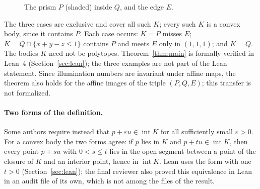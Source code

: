 \documentclass[11pt]{article}
\theoremstyle{definition}
\theoremstyle{remark}
\newcommand{\inter}{\operatorname{int}}
\begin{document}
\begin{figure}
\vspace{-3ex}\centering
{}
\caption{The prism $P$ (shaded) inside $Q$, and the edge $E$.}
\label{fig:prism}
\vspace{-2ex}
\end{figure}

\noindent The three cases are exclusive and cover all such $K$; every such
$K$ is a convex body, since it contains $P$. Each case occurs: $K=P$ misses
$E$; $K=Q\cap\{x+y-z\le1\}$ contains $P$ and meets $E$ only in $(1,1,1)$; and
$K=Q$. The bodies $K$ need not be polytopes. Theorem~\ref{thm:main} is formally
verified in Lean~4 (Section~\ref{sec:lean}); the three examples are not part of
the Lean statement. Since illumination numbers are invariant under affine
maps, the theorem also holds for the affine images of the triple $(P,Q,E)$;
this transfer is not formalized.

\paragraph{Two forms of the definition.} Some authors require instead that
$p+\varepsilon u\in\inter K$ for all sufficiently small $\varepsilon>0$. For a
convex body the two forms agree: if $p$ lies in $K$ and $p+tu\in\inter K$, then
every point $p+su$ with $0<s\le t$ lies in the open segment between a point of
the closure of $K$ and an interior point, hence in $\inter K$. Lean uses the
form with one $t>0$ (Section~\ref{sec:lean}); the final reviewer also proved
this equivalence in Lean in an audit file of its own, which is not among the
files of the result.
\end{document}
